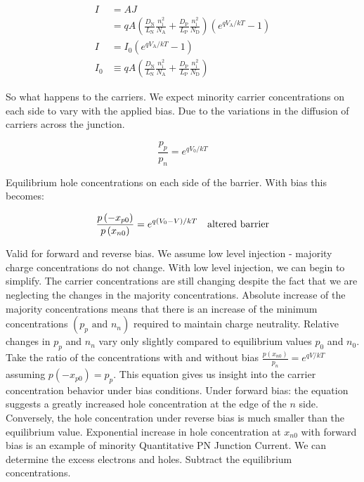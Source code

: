 \documentclass[main.tex]{subfiles}
\begin{document}
\begin{enumerate}
\begin{enumerate}
        $$
        \begin{aligned}
        I &=AJ \\
        &=qA\left(\frac{D_{\mathrm{N}}}{L_{\mathrm{N}}} \frac{n_{\mathrm{i}}^2}{N_{\mathrm{A}}}+\frac{D_{\mathrm{P}}}{L_{\mathrm{P}}} \frac{n_{\mathrm{i}}^2}{N_{\mathrm{D}}}\right)\left(e^{q V_{\mathrm{A}} / k T}-1\right)\\
        I &=I_0\left(e^{q V_{\mathrm{A}} / k T}-1\right) \\
        I_0 &\equiv q A\left(\frac{D_{\mathrm{N}}}{L_{\mathrm{N}}} \frac{n_{\mathrm{i}}^2}{N_{\mathrm{A}}}+\frac{D_{\mathrm{P}}}{L_{\mathrm{P}}} \frac{n_{\mathrm{i}}^2}{N_{\mathrm{D}}}\right)
        \end{aligned}
        $$

        So what happens to the carriers. We expect minority carrier concentrations on each side to vary with the applied bias. Due to the variations in the diffusion of carriers across the junction.

        $$
        \frac{p_p}{p_n}=e^{q V_0 / k T}
        $$

        Equilibrium hole concentrations on each side of the barrier. With bias this becomes: 

        $$
        \begin{aligned}
        \frac{p\left(-x_{p 0}\right)}{p\left(x_{n 0}\right)}=e^{q \left(V_0-V\right)/kT} \text{\quad altered barrier} 
        \end{aligned}
        $$

        Valid for forward and reverse bias. We assume low level injection - majority charge concentrations do not change. With low level injection, we can begin to simplify. The carrier concentrations are still changing despite the fact that we are neglecting the changes in the majority concentrations. Absolute increase of the majority concentrations means that there is an increase of the minimum concentrations $\left(p_p \text{ and } n_n\right)$ required to maintain charge neutrality. Relative changes in $p_p$ and $n_n$ vary only slightly compared to equilibrium values $p_0$ and $n_0$. Take the ratio of the concentrations with and without bias $\frac{p\left(x_{n 0}\right)}{p_n}=e^{q V / k T}$ assuming $p\left(-x_{p 0}\right)=p_p$. This equation gives us insight into the carrier concentration behavior under bias conditions. Under forward bias: the equation suggests a greatly increased hole concentration at the edge of the $n$ side. Conversely, the hole concentration under reverse bias is much smaller than the equilibrium value. Exponential increase in hole concentration at $x_{n0}$ with forward bias is an example of minority Quantitative PN Junction Current. We can determine the excess electrons and holes. Subtract the equilibrium concentrations.


\end{enumerate}
\end{enumerate}
\end{document}
